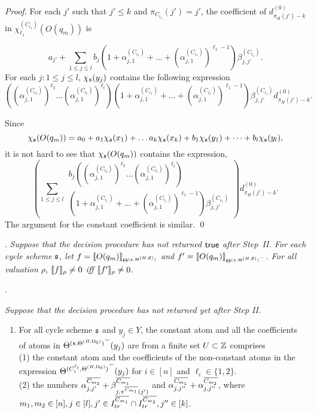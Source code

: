 \begin{appendix}
\begin{proof}
For each $j'$ such that $j' \le k$ and $\pi_{C_{i_1}}(j')=j'$, the coefficient of $d^{(0)}_{\pi_H(j')-k}$ in $\chi^{(C_{i_1})}_{\ell_1}(O(q_m))$ is 

\[a_{j'} + \sum \limits_{1 \le j \le l} b_j \left(1+\alpha^{(C_{i_1})}_{j,1} + \dots + (\alpha^{(C_{i_1})}_{j,1})^{\ell_1-1} \right) \beta^{(C_{i_1})}_{j,j'}.\]
%
%
For each $j: 1 \le j \le l$, $\chi_{{\mathfrak{s} }}(y_j)$ contains the following expression 
\[\left((\alpha^{(C_{i_2})}_{j,1})^{\ell_2} \dots (\alpha^{(C_{i_t})}_{j,1})^{\ell_t}\right)\left(1+\alpha^{(C_{i_1})}_{j,1} + \dots + (\alpha^{(C_{i_1})}_{j,1})^{\ell_1-1} \right) \beta^{(C_{i_1})}_{j,j'} d^{(0)}_{\pi_H(j')-k}.\]

Since 
\[
\chi_{{\mathfrak{s} }}(O(q_m)) = a_0 + a_1 \chi_{{\mathfrak{s} }}(x_1) + \dots a_k \chi_{{\mathfrak{s} }}(x_k) + b_1 \chi_{{\mathfrak{s} }}(y_1) + \dots + b_l \chi_{{\mathfrak{s} }}(y_l),
\] 
it is not hard to see that $\chi_{\mathfrak{s} }(O(q_m))$ contains the expression,
\[
\left(\sum \limits_{1 \le j \le l} 
\begin{array}{l}
b_j \left((\alpha^{(C_{i_2})}_{j,1})^{\ell_2} \dots (\alpha^{(C_{i_t})}_{j,1})^{\ell_t}\right) \\
\left(1+\alpha^{(C_{i_1})}_{j,1} + \dots + (\alpha^{(C_{i_1})}_{j,1})^{\ell_1-1} \right) \beta^{(C_{i_1})}_{j,j'}
\end{array}
\right) d^{(0)}_{\pi_H(j')-k}. 
\]
The argument for the constant coefficient is similar.
\qed
\end{proof}


\smallskip

.
{\it	Suppose that the decision procedure has not returned $\mathsf{true}$ after Step~II. For each cycle scheme ${\mathfrak{s} }$, let $f=\llbracket O(q_m)\rrbracket_{\Theta^{({\mathfrak{s} }, \Theta^{(H,\emptyset)})}}$ and $f'=\llbracket O(q_m)\rrbracket_{{\Theta^{({\mathfrak{s} }, \Theta^{(H,\emptyset)})}}^-}$. For all valuation $\rho$, $\llbracket f\rrbracket_{\rho}\neq 0$ iff $\llbracket f'\rrbracket_{\rho} \neq 0$.
}


.
{\it 
Suppose that the decision procedure has not returned yet after Step II. 
\begin{enumerate}
\item For all cycle scheme ${\mathfrak{s} }$ and $y_j \in Y$, the constant atom and all the coefficients of atoms in ${\Theta^{({\mathfrak{s} }, \Theta^{(H,\Omega_0)})}}^-(y_j)$ are from a finite set $U \subset {\mathbb{Z} }$ comprises\\ (1)
the constant atom and the coefficients of the non-constant atoms in the expression ${\Theta^{(C^{\ell_i}_{i}, \Theta^{(H,\Omega_0)})}}^-(y_j)$ for $i\in [n]$ and $\ell_i \in \{1,2\}$.\smallskip\\(2) the numbers $\alpha^{\overline{C_{m_2}}}_{j,j'} + \beta^{\overline{C_{m_1}}}_{j,\pi^{\overline{C_{m_1}}}(j')}$ and $\alpha^{\overline{C_{m_1}}}_{j, j''} + \alpha^{\overline{C_{m_2}}}_{j,j''}$, where  $m_1,m_2 \in [n], j\in[l],j' \in I^{\overline{C_{m_1}}}_{tr} \cap I^{\overline{C_{m_2}}}_{tr},  j'' \in [k]$. 


\end{enumerate}}
\end{appendix}
